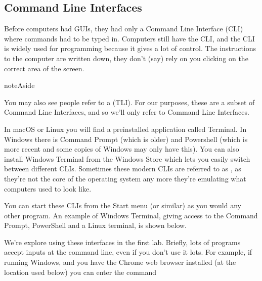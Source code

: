 \documentclass[letterpaper,10pt,british]{sphinxmanual}
\let\sphinxpxdimen\pdfpxdimen\else\newdimen\sphinxpxdimen
\begin{document}
\begin{figure}[htbp]
\centering

\noindent\sphinxincludegraphics[width=800\sphinxpxdimen]{{gui_windows}.png}
\end{figure}


\subsection{Command Line Interfaces}
\label{\detokenize{chapters/computer_software/gui_and_cli:command-line-interfaces}}
\sphinxAtStartPar
Before computers had GUIs, they had only a Command Line Interface (CLI) where commands had to be typed in. Computers still have the CLI, and the CLI is widely used for programming because it gives a lot of control. The instructions to the computer are written down, they don’t (say) rely on you clicking on the correct area of the screen.

\begin{sphinxadmonition}{note}{Aside}

\sphinxAtStartPar
You may also see people refer to a  (TLI). For our purposes, these are a sub\sphinxhyphen{}set of Command Line Interfaces, and so we’ll only refer to Command Line Interfaces.
\end{sphinxadmonition}

\sphinxAtStartPar
In macOS or Linux you will find a pre\sphinxhyphen{}installed application called Terminal. In Windows there is Command Prompt (which is older) and Powershell (which is more recent and some copies of Windows may only have this). You can also install Windows Terminal from the Windows Store which lets you easily switch between different CLIs. Sometimes these modern CLIs are referred to as , as they’re not the core of the operating system any more they’re emulating what computers used to look like.

\sphinxAtStartPar
You can start these CLIs from the Start menu (or similar) as you would any other program. An example of Windows Terminal, giving access to the Command Prompt, PowerShell and a Linux terminal, is shown below.

\begin{figure}[htbp]
\centering

\noindent\sphinxincludegraphics[width=800\sphinxpxdimen]{{terminal}.png}
\end{figure}

\sphinxAtStartPar
We’re explore using these interfaces in the first lab. Briefly, lots of programs accept inputs at the command line, even if you don’t use it lots. For example, if running Windows, and you have the Chrome web browser installed (at the location used below) you can enter the command
\end{document}
